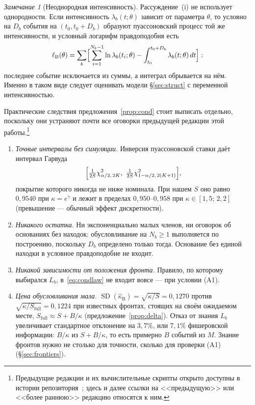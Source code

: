 \documentclass[11pt,a4paper]{article}
\theoremstyle{plain}
\theoremstyle{remark}
\newtheorem{remark}{Замечание}
\newcommand{\eg}{e^{\gamma}}
\begin{document}
\begin{remark}[Неоднородная интенсивность]\label{rem:inhom}
Рассуждение~(i) не использует однородности. Если интенсивность
$\lambda_b(t;\theta)$ зависит от параметра $\theta$, то условно на $D_b$ события
на $(t_0,t_0+D_b)$ образуют пуассоновский процесс той же интенсивности, и
условный логарифм правдоподобия есть
\begin{equation}\label{eq:condinhom}
\ell_{\mathrm B}(\theta)=\sum_b\Bigl[\sum_{i=1}^{N_b-1}\ln\lambda_b(t_i;\theta)
-\int_{t_0}^{t_0+D_b}\lambda_b(t;\theta)\,dt\Bigr]:
\end{equation}
последнее событие исключается из суммы, а интеграл обрывается на нём. Именно в
таком виде следует оценивать модели \S\ref{sec:struct} с переменной
интенсивностью.
\end{remark}

Практические следствия предложения~\ref{prop:cond} стоит выписать отдельно,
поскольку они устраняют почти все оговорки предыдущей редакции этой
работы.\footnote{Предыдущие редакции и их вычислительные скрипты открыто доступны
в истории репозитория~\cite{repunithunt}; здесь и далее ссылки на <<предыдущую>>
или <<более раннюю>> редакцию относятся к ним.}

\begin{enumerate}
\item \emph{Точные интервалы без симуляции.} Инверсия пуассоновской ставки даёт
интервал Гарвуда~\cite{garwood1936}
\begin{equation}\label{eq:garwood}
\Bigl[\tfrac{1}{2S}\chi^2_{\alpha/2,\,2K},\ \tfrac{1}{2S}\chi^2_{1-\alpha/2,\,2(K+1)}\Bigr],
\end{equation}
покрытие которого никогда не ниже номинала. При нашем $S$ оно равно $0{,}9540$
при $\kappa=\eg$ и лежит в пределах $0{,}950$--$0{,}958$ при
$\kappa\in[1{,}5;\,2{,}2]$ (превышение --- обычный эффект дискретности).
\item \emph{Никакого остатка.} Ни экспоненциально малых членов, ни оговорок об
основаниях без находок: обусловливание на $N_b\ge1$ выполняется по построению,
поскольку $D_b$ определено только тогда. Основание без единой находки в
условное правдоподобие не входит.
\item \emph{Никакой зависимости от положения фронта.} Правило, по которому
выбирался $L_b$, в~\eqref{eq:condlaw} не входит вовсе --- при условии (A1).
\item \emph{Цена обусловливания мала.} $\operatorname{SD}(\hat\kappa_{\mathrm B})
=\sqrt{\kappa/S}=0{,}1270$ против $\sqrt{\kappa/S_{\mathrm{full}}}=0{,}1224$
при известных фронтах, стоящих на своём ожидаемом месте,
$S_{\mathrm{full}}\approx S+B/\kappa$ (предложение~\ref{prop:delta}). Отказ от
знания $L_b$ увеличивает стандартное отклонение на $3{,}7\%$, или $7{,}1\%$ фишеровской
информации: $B/\kappa$ из $S+B/\kappa$, то есть примерно $B$ событий из $M$.
Знание фронтов нужно не столько для точности, сколько для проверки (A1)
(\S\ref{sec:frontiers}).
\end{enumerate}
\end{document}

